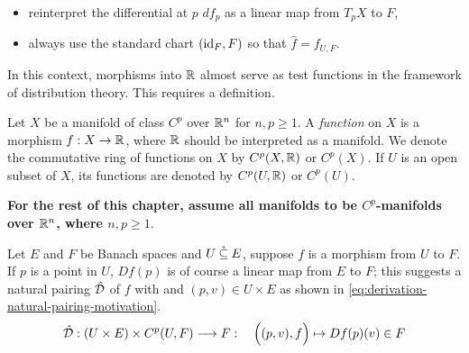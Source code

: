 \documentclass[../main-manifolds.tex]{subfiles}
\begin{document}
\begin{itemize}
    \item reinterpret the differential at $p$ $df_p$ as a linear map from $T_p X$ to $F$,
    \item always use the standard chart $(\operatorname{id}_{F}, F)$ so that $\hat{f} = f_{U,F}$.
\end{itemize}


In this context, morphisms into $\mathbb{R}$ almost serve as test functions in the framework of distribution theory. This requires a definition.

\begin{definition}[Function on $X$]\label{def:function-on-X}
    Let $X$ be a manifold of class $C^p$ over ${\mathbb{R}^n}$ for $n,p\geq 1$. A \emph{function} on $X$ is a morphism $f: X\to\mathbb{R}$, where $\mathbb{R}$ should be interpreted as a manifold. We denote the commutative ring of functions on $X$ by $C^p(X,\mathbb{R})$ or $C^p(X)$. If $U$ is an open subset of $X$, its functions are denoted by $C^p(U,\mathbb{R})$ or $C^p(U)$.
\end{definition}
\textbf{For the rest of this chapter, assume all manifolds to be $C^p$-manifolds over ${\mathbb{R}^n}$, where $n,p \geq 1$}. 



Let $E$ and $F$ be Banach spaces and $U\:\mathring{\subseteq}\: E$, suppose $f$ is a morphism from $U$ to $F$. If $p$ is a point in $U$, $Df(p)$ is of course a linear map from $E$ to $F$; this suggests a natural pairing $\hat{\mathcal{D}}$ of $f$ with and $(p,v)\in U\times E$ as shown in \cref{eq:derivation-natural-pairing-motivation}.
\begin{equation}\label{eq:derivation-natural-pairing-motivation}
    \hat{\mathcal{D}}: (U\times E)\times C^p(U,F)\longrightarrow F:\quad \qty\Big((p,v), f)\mapsto Df(p)(v)\in F
\end{equation}
\end{document}
